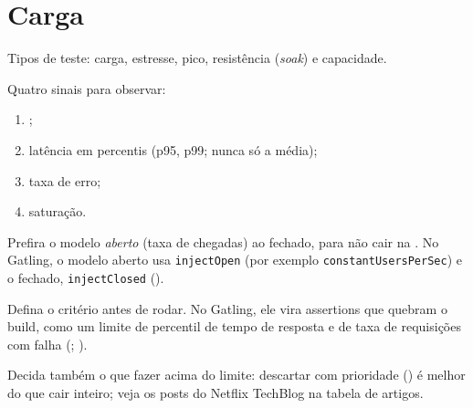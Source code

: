 \section{Carga}

Tipos de teste: carga, estresse, pico, resistência (\emph{soak}) e
capacidade.

Quatro sinais para observar:
\begin{enumerate}
\item {};
\item latência em percentis (p95, p99; nunca só a média);
\item taxa de erro;
\item saturação.
\end{enumerate}

Prefira o modelo \emph{aberto} (taxa de chegadas) ao fechado, para não
cair na . No Gatling, o modelo aberto usa \texttt{injectOpen}
(por exemplo \texttt{constant\-Users\-PerSec}) e o fechado, \texttt{injectClosed}
().

Defina o critério antes de rodar. No Gatling, ele vira assertions que
quebram o build, como um limite de percentil de tempo de resposta e de taxa
de requisições com falha (;
).

Decida também o que fazer acima do limite: descartar com prioridade
() é melhor do
que cair inteiro; veja os posts do Netflix TechBlog na tabela de artigos.
